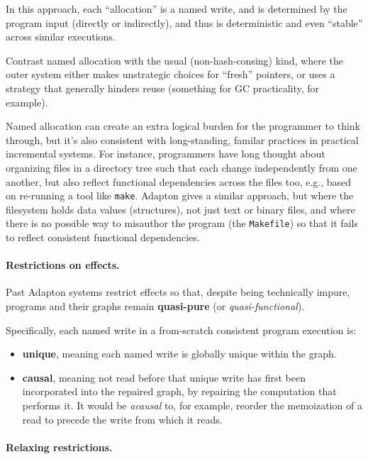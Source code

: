 \documentclass[11pt]{article}
\begin{document}
In this approach, each ``allocation'' is a named write, and is
determined by the program input (directly or indirectly), and thus is
deterministic and even ``stable'' across similar executions.

Contrast named allocation with the usual (non-hash-consing) kind, where the outer system either makes unstrategic choices for ``fresh'' pointers, or uses a strategy that generally hinders reuse (something for GC practicality, for example).

Named allocation can create an extra logical burden for the programmer to think through, but it's also consistent with long-standing, familar practices in practical incremental systems.
%
For instance, programmers have long thought about organizing files in a directory tree such that each change independently from one another, but also reflect functional dependencies across the files too, e.g., based on re-running a tool like \texttt{make}.
%
Adapton gives a similar approach, but where the filesystem holds data values (structures), not just text or binary files, and where there is no possible way to misauthor the program (the \texttt{Makefile}) so that it fails to reflect consistent functional dependencies.

\paragraph{Restrictions on effects.}
%
Past Adapton systems restrict effects so that, despite being technically impure, programs and their graphs remain \textbf{quasi-pure} (or \emph{quasi-functional}).

Specifically, each named write in a from-scratch consistent program execution is:

\begin{itemize}
\item \textbf{unique}, meaning each named write is globally unique within the graph.
  
\item \textbf{causal}, meaning not read before that unique write has first been incorporated into the repaired graph, by repairing the computation that performs it.  It would be \emph{acausal} to, for example, reorder the memoization of a read to precede the write from which it reads.
\end{itemize}


\paragraph{Relaxing restrictions.}
\end{document}
